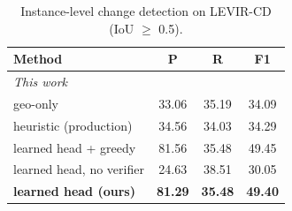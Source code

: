 \begin{table}[t]
\centering
\caption{Instance-level change detection on LEVIR-CD (IoU $\geq$ 0.5).}
\label{tab:levir_cd_instance}
\setlength{\tabcolsep}{4pt}
\begin{tabular}{lccc}
\toprule
Method & P & R & F1 \\
\midrule
\multicolumn{4}{l}{\emph{This work}} \\
geo-only & 33.06 & 35.19 & 34.09 \\
heuristic (production) & 34.56 & 34.03 & 34.29 \\
learned head + greedy & 81.56 & 35.48 & 49.45 \\
learned head, no verifier & 24.63 & 38.51 & 30.05 \\
\textbf{learned head (ours)} & \textbf{81.29} & \textbf{35.48} & \textbf{49.40} \\
\bottomrule
\end{tabular}
\end{table}
